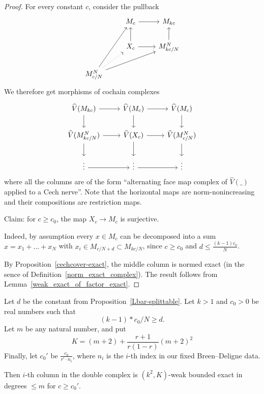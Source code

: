 \begin{proof}
  \leanok
  For every constant $c$,
  consider the pullback
  \[
    \begin{tikzcd}
      & M_c \rar & M_{kc} \\
      & X_c \uar \rar & M^N_{kc/N} \uar \\
      M^N_{c/N} \ar{uur} \ar{rru} \ar[dotted]{ur}
    \end{tikzcd}
  \]
  We therefore get morphisms of cochain complexes
  \[
    \begin{tikzcd}
      \hat V(M_{kc}) \rar\dar & \hat V(M_c) \rar\dar & \hat V(M_c) \dar \\
      \hat V(M^N_{kc/N}) \rar\dar & \hat V(X_c) \rar\dar & \hat V(M^N_{c/N}) \dar \\
      \vdots \rar & \vdots \rar & \vdots
    \end{tikzcd}
  \]
  where all the columns are of the form
  ``alternating face map complex of $\hat V(\_)$ applied to a Cech nerve''.
  Note that the horizontal maps are norm-nonincreasing
  and their compositions are restriction maps.

  Claim: for $c \ge c_0$, the map $X_c \to M_c$ is surjective.

  Indeed, by assumption every $x \in M_c$ can be decomposed into a sum
  $x = x_1 + \dots + x_N$ with $x_i \in M_{c/N+d} \subset M_{kc/N}$,
  since $c \ge c_0$ and $d \le \frac{(k-1)c_0}{N}$.

  By Proposition~\ref{cechcover-exact},
  the middle column is normed exact (in the sence of Definition~\ref{norm_exact_complex}).
  The result follows from Lemma~\ref{weak_exact_of_factor_exact}.
\end{proof}

\begin{proposition}
  \label{col_exact}
  \leanok
  Let $d$ be the constant from Proposition~\ref{Lbar-splittable}.
  Let $k > 1$ and $c_0 > 0$ be real numbers such that
  \[
    (k - 1) * c_0 / N \ge d.
  \]
  Let $m$ be any natural number, and put
  \[
    K = (m + 2) + \frac{r + 1}{r(1 - r)} (m + 2)^2
  \]
  Finally, let $c_0'$ be $\frac{c_0}{r' \cdot n_i}$,
  where $n_i$ is the $i$-th index in our fixed Breen--Deligne data.

  Then $i$-th column in the double complex
  is $(k^2, K)$-weak bounded exact in degrees $\le m$ for $c \ge c_0'$.
\end{proposition}

